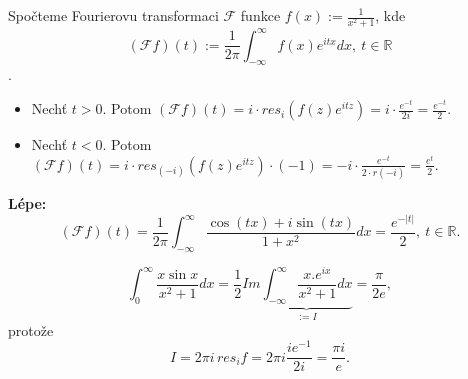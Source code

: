 \begin{example}
Spočteme Fourierovu transformaci $\mathcal{F}$ funkce $f(x):=\frac{1}{x^2+1}$, kde
$$(\mathcal{F}f)(t):=\frac{1}{2\pi}\int_{-\infty}^\infty{f(x)e^{itx}}dx, \ t\in\mathbb{R}$$.
\begin{itemize}
    \item Nechť $t>0$. Potom $(\mathcal{F}f)(t)=i\cdot{res}_i{(f(z)e^{itz})}=i\cdot\frac{e^{-t}}{2i}=\frac{e^{-t}}{2}$.
    \item Nechť $t<0$. Potom $(\mathcal{F}f)(t)=i\cdot{res}_{(-i)}{(f(z)e^{itz})}\cdot(-1)=-i\cdot\frac{e^{-t}}{2\cdot  r(-i)}=\frac{e^{t}}{2}$.
\end{itemize}
\textbf{Lépe:}
$$(\mathcal{F}f)(t)=\frac{1}{2\pi}\int_{-\infty}^\infty\frac{\cos{(tx)}+i\sin{(tx)}}{1+x^2}dx=\frac{e^{-|t|}}{2}, \ t\in\mathbb{R}.$$
\end{example}

\begin{example}
$$\int_0^\infty\frac{x\sin{x}}{x^2+1}dx=\frac{1}{2}{Im}\underset{:=I}{\underbrace{\int_{-\infty}^\infty\frac{x.e^{ix}}{x^2+1}dx}}=\frac{\pi}{2e},$$
protože
$$I=2\pi i\,{res}_{i}{f}=2\pi i \frac{ie^{-1}}{2i}=\frac{\pi i}{e}.$$
\end{example}